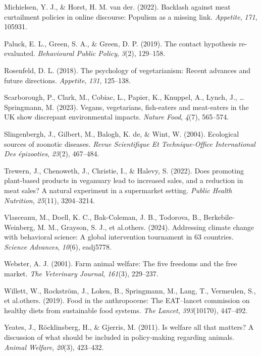 \documentclass[
  man]{apa6}
\newlength{\cslhangindent}
\newenvironment{CSLReferences}[2] %
 {\begin{list}{}{%
  \setlength{\itemindent}{0pt}
  \setlength{\leftmargin}{0pt}
  \setlength{\parsep}{0pt}
  \ifodd #1
   \setlength{\leftmargin}{\cslhangindent}
   \setlength{\itemindent}{-1\cslhangindent}
  \fi
  \setlength{\itemsep}{#2\baselineskip}}}
 {\end{list}}
\begin{document}
\begin{CSLReferences}{1}{0}
Michielsen, Y. J., \& Horst, H. M. van der. (2022). Backlash against meat curtailment policies in online discourse: Populism as a missing link. \emph{Appetite}, \emph{171}, 105931.

Paluck, E. L., Green, S. A., \& Green, D. P. (2019). The contact hypothesis re-evaluated. \emph{Behavioural Public Policy}, \emph{3}(2), 129--158.

Rosenfeld, D. L. (2018). The psychology of vegetarianism: Recent advances and future directions. \emph{Appetite}, \emph{131}, 125--138.

Scarborough, P., Clark, M., Cobiac, L., Papier, K., Knuppel, A., Lynch, J., \ldots{} Springmann, M. (2023). Vegans, vegetarians, fish-eaters and meat-eaters in the UK show discrepant environmental impacts. \emph{Nature Food}, \emph{4}(7), 565--574.

Slingenbergh, J., Gilbert, M., Balogh, K. de, \& Wint, W. (2004). Ecological sources of zoonotic diseases. \emph{Revue Scientifique Et Technique-Office International Des {é}pizooties}, \emph{23}(2), 467--484.

Trewern, J., Chenoweth, J., Christie, I., \& Halevy, S. (2022). Does promoting plant-based products in veganuary lead to increased sales, and a reduction in meat sales? A natural experiment in a supermarket setting. \emph{Public Health Nutrition}, \emph{25}(11), 3204--3214.

Vlasceanu, M., Doell, K. C., Bak-Coleman, J. B., Todorova, B., Berkebile-Weinberg, M. M., Grayson, S. J., et al.others. (2024). Addressing climate change with behavioral science: A global intervention tournament in 63 countries. \emph{Science Advances}, \emph{10}(6), eadj5778.

Webster, A. J. (2001). Farm animal welfare: The five freedoms and the free market. \emph{The Veterinary Journal}, \emph{161}(3), 229--237.

Willett, W., Rockström, J., Loken, B., Springmann, M., Lang, T., Vermeulen, S., et al.others. (2019). Food in the anthropocene: The EAT--lancet commission on healthy diets from sustainable food systems. \emph{The Lancet}, \emph{393}(10170), 447--492.

Yeates, J., Röcklinsberg, H., \& Gjerris, M. (2011). Is welfare all that matters? A discussion of what should be included in policy-making regarding animals. \emph{Animal Welfare}, \emph{20}(3), 423--432.

\end{CSLReferences}
\end{document}
